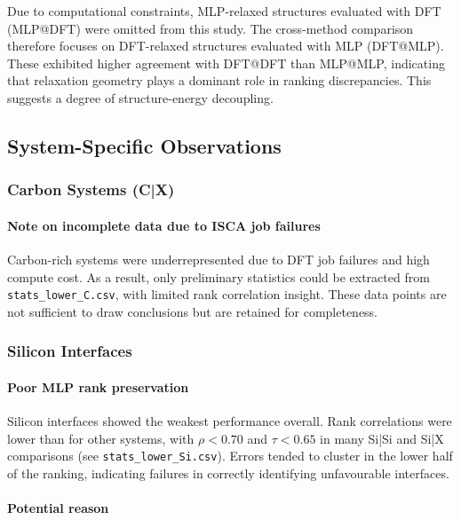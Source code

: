 Due to computational constraints, MLP-relaxed structures evaluated with DFT (MLP@DFT) were omitted from this study. The cross-method comparison therefore focuses on DFT-relaxed structures evaluated with MLP (DFT@MLP). These exhibited higher agreement with DFT@DFT than MLP@MLP, indicating that relaxation geometry plays a dominant role in ranking discrepancies. This suggests a degree of structure-energy decoupling.

\subsection{System-Specific Observations}

\subsubsection{Carbon Systems (C|X)}

\paragraph{Note on incomplete data due to ISCA job failures}

Carbon-rich systems were underrepresented due to DFT job failures and high compute cost. As a result, only preliminary statistics could be extracted from \texttt{stats\_lower\_C.csv}, with limited rank correlation insight. These data points are not sufficient to draw conclusions but are retained for completeness.

\subsubsection{Silicon Interfaces}

\paragraph{Poor MLP rank preservation}

Silicon interfaces showed the weakest performance overall. Rank correlations were lower than for other systems, with $\rho < 0.70$ and $\tau < 0.65$ in many Si|Si and Si|X comparisons (see \texttt{stats\_lower\_Si.csv}). Errors tended to cluster in the lower half of the ranking, indicating failures in correctly identifying unfavourable interfaces.

\paragraph{Potential reason}

